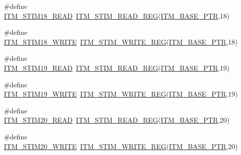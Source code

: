 \begin{DoxyCompactItemize}
\item 
\#define \hyperlink{group___i_t_m___register___accessor___macros_ga4d40ae88921303412c9628a350572a8a}{I\+T\+M\+\_\+\+S\+T\+I\+M18\+\_\+\+R\+E\+AD}~\hyperlink{group___i_t_m___register___accessor___macros_ga5009882336aadcd4f37b45cf3395c450}{I\+T\+M\+\_\+\+S\+T\+I\+M\+\_\+\+R\+E\+A\+D\+\_\+\+R\+EG}(\hyperlink{group___i_t_m___peripheral_gafaddee8fe8b6a898d4e5edc43ee0d703}{I\+T\+M\+\_\+\+B\+A\+S\+E\+\_\+\+P\+TR},18)
\item 
\#define \hyperlink{group___i_t_m___register___accessor___macros_ga1fb39bc1a36c6aed07b8588d2d1c77b0}{I\+T\+M\+\_\+\+S\+T\+I\+M18\+\_\+\+W\+R\+I\+TE}~\hyperlink{group___i_t_m___register___accessor___macros_ga049ca92a4e78e77c19af81e51aa73f1c}{I\+T\+M\+\_\+\+S\+T\+I\+M\+\_\+\+W\+R\+I\+T\+E\+\_\+\+R\+EG}(\hyperlink{group___i_t_m___peripheral_gafaddee8fe8b6a898d4e5edc43ee0d703}{I\+T\+M\+\_\+\+B\+A\+S\+E\+\_\+\+P\+TR},18)
\item 
\#define \hyperlink{group___i_t_m___register___accessor___macros_gaae6a230f21e1fb36ab999e662677ac65}{I\+T\+M\+\_\+\+S\+T\+I\+M19\+\_\+\+R\+E\+AD}~\hyperlink{group___i_t_m___register___accessor___macros_ga5009882336aadcd4f37b45cf3395c450}{I\+T\+M\+\_\+\+S\+T\+I\+M\+\_\+\+R\+E\+A\+D\+\_\+\+R\+EG}(\hyperlink{group___i_t_m___peripheral_gafaddee8fe8b6a898d4e5edc43ee0d703}{I\+T\+M\+\_\+\+B\+A\+S\+E\+\_\+\+P\+TR},19)
\item 
\#define \hyperlink{group___i_t_m___register___accessor___macros_ga0dcaa81a5a092538e5d2184087988886}{I\+T\+M\+\_\+\+S\+T\+I\+M19\+\_\+\+W\+R\+I\+TE}~\hyperlink{group___i_t_m___register___accessor___macros_ga049ca92a4e78e77c19af81e51aa73f1c}{I\+T\+M\+\_\+\+S\+T\+I\+M\+\_\+\+W\+R\+I\+T\+E\+\_\+\+R\+EG}(\hyperlink{group___i_t_m___peripheral_gafaddee8fe8b6a898d4e5edc43ee0d703}{I\+T\+M\+\_\+\+B\+A\+S\+E\+\_\+\+P\+TR},19)
\item 
\#define \hyperlink{group___i_t_m___register___accessor___macros_gaec08b7ed3a53bdd0c49f608929a323ed}{I\+T\+M\+\_\+\+S\+T\+I\+M20\+\_\+\+R\+E\+AD}~\hyperlink{group___i_t_m___register___accessor___macros_ga5009882336aadcd4f37b45cf3395c450}{I\+T\+M\+\_\+\+S\+T\+I\+M\+\_\+\+R\+E\+A\+D\+\_\+\+R\+EG}(\hyperlink{group___i_t_m___peripheral_gafaddee8fe8b6a898d4e5edc43ee0d703}{I\+T\+M\+\_\+\+B\+A\+S\+E\+\_\+\+P\+TR},20)
\item 
\#define \hyperlink{group___i_t_m___register___accessor___macros_ga1e109dc4eb08a82ad21ba29f64b02976}{I\+T\+M\+\_\+\+S\+T\+I\+M20\+\_\+\+W\+R\+I\+TE}~\hyperlink{group___i_t_m___register___accessor___macros_ga049ca92a4e78e77c19af81e51aa73f1c}{I\+T\+M\+\_\+\+S\+T\+I\+M\+\_\+\+W\+R\+I\+T\+E\+\_\+\+R\+EG}(\hyperlink{group___i_t_m___peripheral_gafaddee8fe8b6a898d4e5edc43ee0d703}{I\+T\+M\+\_\+\+B\+A\+S\+E\+\_\+\+P\+TR},20)

\end{DoxyCompactItemize}
